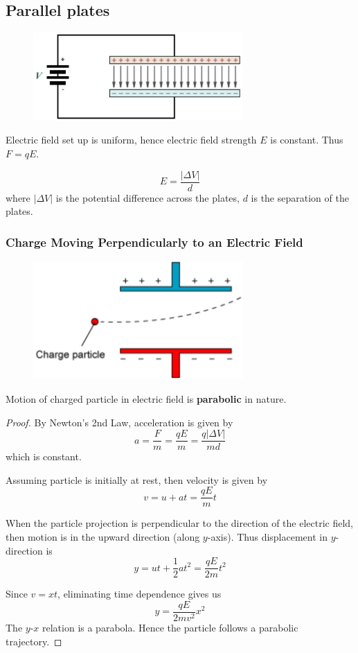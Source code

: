 \subsection{Parallel plates}
\begin{figure}[H]
    \centering
    \includegraphics[width=8cm]{images/parallel_plates.jpg}
\end{figure}

Electric field set up is uniform, hence electric field strength $E$ is constant. Thus $F=qE$.

\begin{equation}
E = \frac{|\Delta V|}{d}
\end{equation}
where $|\Delta V|$ is the potential difference across the plates, $d$ is the separation of the plates.

\subsubsection{Charge Moving Perpendicularly to an Electric Field}
\begin{figure}[H]
    \centering
    \includegraphics[width=8cm]{images/parallelplates_parabolic.jpg}
\end{figure}

Motion of charged particle in electric field is \textbf{parabolic} in nature.

\begin{proof}
By Newton's 2nd Law, acceleration is given by
\[ a=\frac{F}{m} = \frac{qE}{m} = \frac{q|\Delta V|}{md} \]
which is constant.

Assuming particle is initially at rest, then velocity is given by 
\[ v = u+at = \frac{qE}{m}t \]

When the particle projection is perpendicular to the direction of the electric field, then motion is in the upward direction (along $y$-axis). Thus displacement in $y$-direction is 
\[ y = ut+\frac{1}{2}at^2 = \frac{qE}{2m}t^2 \]

Since $v=xt$, eliminating time dependence gives us 
\[ y = \frac{qE}{2mv^2}x^2 \]
The $y$-$x$ relation is a parabola. Hence the particle follows a parabolic trajectory.
\end{proof}

